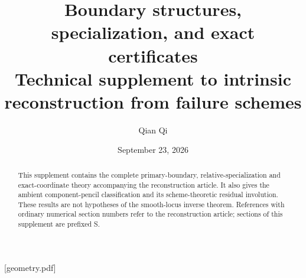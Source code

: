 
[geometry.pdf]
\renewcommand{\thesection}{S\arabic{section}}

\title[Boundary structures and exact certificates]{Boundary structures, specialization, and exact certificates\\Technical supplement to intrinsic reconstruction from failure schemes}
\author{Qian Qi}
\date{September 23, 2026 }
\begin{abstract}This supplement contains the complete primary-boundary,
relative-specialization and exact-coordinate theory accompanying the
reconstruction article.  It also gives the ambient component-pencil
classification and its scheme-theoretic residual involution.
These results are not hypotheses of the smooth-locus inverse theorem.
References with ordinary numerical section numbers refer to the
reconstruction article; sections of this supplement are prefixed S.
\end{abstract}
\maketitle
\enlargethispage{3pt}
\tableofcontents


















